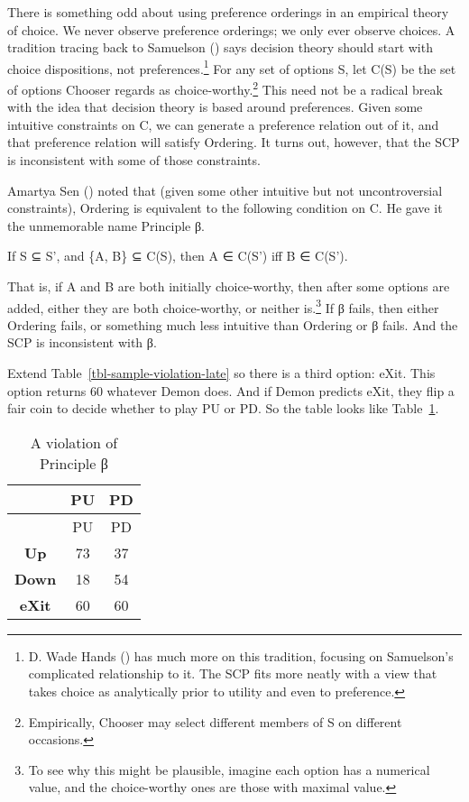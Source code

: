 \documentclass[
  11pt,
  letterpaper,
  DIV=11,
  numbers=noendperiod,
  twoside]{scrartcl}
\providecommand{\tightlist}{%
  \setlength{\itemsep}{0pt}\setlength{\parskip}{0pt}}\usepackage{longtable,booktabs,array}
\begin{document}
There is something odd about using preference orderings in an empirical
theory of choice. We never observe preference orderings; we only ever
observe choices. A tradition tracing back to Samuelson
() says decision theory should start
with choice dispositions, not preferences.\footnote{D. Wade Hands
  () has much more on this tradition,
  focusing on Samuelson's complicated relationship to it. The SCP fits
  more neatly with a view that takes choice as analytically prior to
  utility and even to preference.} For any set of options S, let C(S) be
the set of options Chooser regards as choice-worthy.\footnote{Empirically,
  Chooser may select different members of S on different occasions.}
This need not be a radical break with the idea that decision theory is
based around preferences. Given some intuitive constraints on C, we can
generate a preference relation out of it, and that preference relation
will satisfy Ordering. It turns out, however, that the SCP is
inconsistent with some of those constraints.

Amartya Sen () noted that (given some other
intuitive but not uncontroversial constraints), Ordering is equivalent
to the following condition on C. He gave it the unmemorable name
Principle β.

\begin{description}
\tightlist
\item[β]
If S ⊆ S', and \{A, B\} ⊆ C(S), then A ∈ C(S') iff B ∈ C(S').
\end{description}

That is, if A and B are both initially choice-worthy, then after some
options are added, either they are both choice-worthy, or neither
is.\footnote{To see why this might be plausible, imagine each option has
  a numerical value, and the choice-worthy ones are those with maximal
  value.} If β fails, then either Ordering fails, or something much less
intuitive than Ordering or β fails. And the SCP is inconsistent with β.

Extend Table~\ref{tbl-sample-violation-late} so there is a third option:
eXit. This option returns 60 whatever Demon does. And if Demon predicts
eXit, they flip a fair coin to decide whether to play PU or PD. So the
table looks like Table~\ref{tbl-beta-violation}.

\begin{longtable}[]{@{}ccc@{}}
\caption{A violation of Principle
β}\label{tbl-beta-violation}\tabularnewline
\toprule\noalign{}
& PU & PD \\
\midrule\noalign{}
\endfirsthead
\toprule\noalign{}
& PU & PD \\
\midrule\noalign{}
\endhead
\bottomrule\noalign{}
\endlastfoot
\textbf{Up} & 73 & 37 \\
\textbf{Down} & 18 & 54 \\
\textbf{eXit} & 60 & 60 \\
\end{longtable}
\end{document}
